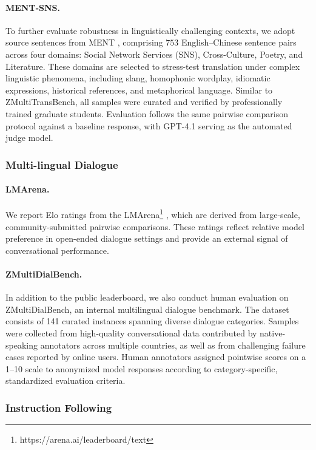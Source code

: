 \paragraph{MENT-SNS.}
To further evaluate robustness in linguistically challenging contexts, we adopt source sentences from MENT \citep{tian2026ment}, comprising \(753\) English–Chinese sentence pairs across four domains: Social Network Services (SNS), Cross-Culture, Poetry, and Literature.
These domains are selected to stress-test translation under complex linguistic phenomena, including slang, homophonic wordplay, idiomatic expressions, historical references, and metaphorical language. Similar to ZMultiTransBench, all samples were curated and verified by professionally trained graduate students.
Evaluation follows the same pairwise comparison protocol against a baseline response, with GPT-4.1 serving as the automated judge model.

\subsubsection{Multi-lingual Dialogue}
\paragraph{LMArena.}
We report Elo ratings from the LMArena\footnote{https://arena.ai/leaderboard/text}
, which are derived from large-scale, community-submitted pairwise comparisons. These ratings reflect relative model preference in open-ended dialogue settings and provide an external signal of conversational performance. %

\paragraph{ZMultiDialBench.}
In addition to the public leaderboard, we also conduct human evaluation on ZMultiDialBench, an internal multilingual dialogue benchmark. The dataset consists of 141 curated instances spanning diverse dialogue categories. Samples were collected from high-quality conversational data contributed by native-speaking annotators across multiple countries, as well as from challenging failure cases reported by online users. 
Human annotators assigned pointwise scores on a 1–10 scale to anonymized model responses according to category-specific, standardized evaluation criteria. 

\subsubsection{Instruction Following}
